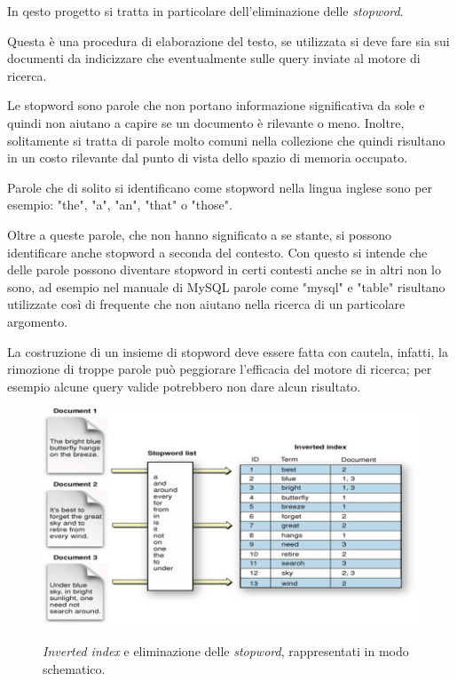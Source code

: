 \documentclass[runningheads]{llncs}
\begin{document}
\vspace{\baselineskip}

In qesto progetto si tratta in particolare dell'eliminazione delle \emph{stopword}\cite{WBC_stopword}.

Questa \`e una procedura di elaborazione del testo, se utilizzata si deve fare sia sui documenti da indicizzare 
che eventualmente sulle query inviate al motore di ricerca.

Le stopword sono parole che non portano informazione significativa da sole e quindi non aiutano a capire se un documento \`e rilevante o meno.
Inoltre, solitamente si tratta di parole molto comuni nella collezione che quindi risultano in un costo rilevante dal punto di vista dello spazio di memoria occupato.

Parole che di solito si identificano come stopword nella lingua inglese sono per esempio: "the", "a", "an", "that" o "those".

Oltre a queste parole, che non hanno significato a se stante, si possono identificare anche stopword a seconda del contesto. 
Con questo si intende che delle parole possono diventare stopword in certi contesti anche se in altri non lo sono, ad esempio nel manuale di
MySQL parole come "mysql" e "table" risultano utilizzate cos\`i di frequente che non aiutano nella ricerca di un particolare argomento.

La costruzione di un insieme di stopword deve essere fatta con cautela, infatti, la rimozione di troppe parole pu\`o peggiorare l'efficacia del motore di ricerca;
per esempio alcune query valide potrebbero non dare alcun risultato.

\begin{figure}%
    \centering
    {{\includegraphics[width=0.8\linewidth]{inverted_index} }}%
    \caption{\emph{Inverted index} e eliminazione delle \emph{stopword}, rappresentati in modo schematico.}%
\end{figure}
\end{document}
